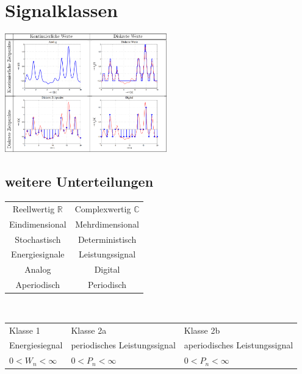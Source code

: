 \section{Signalklassen}
\begin{multicols}{2}
    \includegraphics[width = 7cm]{include/Signalklassen/img/Signalklassen.png}
    \subsection{weitere Unterteilungen}
    \begin{tabular}{|c|c|}
        \hline
        Reellwertig $\mathbb{R}$ & Complexwertig $\mathbb{C}$ \\
        Eindimensional           & Mehrdimensional            \\
        Stochastisch             & Deterministisch            \\
        Energiesignale           & Leistungssignal            \\
        Analog                   & Digital                    \\
        Aperiodisch              & Periodisch                 \\
        \hline
    \end{tabular}
    \\[10pt]
    \begin{tabular}{|p{70pt}|p{70pt}|p{70pt}|}
        \hline
        Klasse 1            &
        Klasse 2a           &
        Klasse 2b                                                                          \\
        Energiesiegnal      & periodisches Leistungssignal & aperiodisches Leistungssignal \\
        $0 < W_n < \infty $ & $0 < P_n < \infty $          & $0 < P_n < \infty$            \\
        \hline
    \end{tabular}
\end{multicols}
